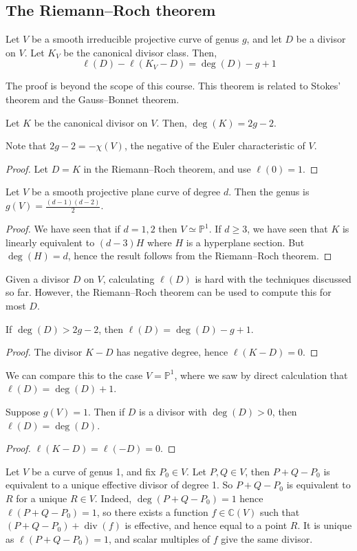 \subsection{The Riemann--Roch theorem}
\begin{theorem}
    Let \( V \) be a smooth irreducible projective curve of genus \( g \), and let \( D \) be a divisor on \( V \).
    Let \( K_V \) be the canonical divisor class.
    Then,
    \[ \ell(D) - \ell(K_V - D) = \deg(D) - g + 1 \]
\end{theorem}
The proof is beyond the scope of this course.
This theorem is related to Stokes' theorem and the Gauss--Bonnet theorem.
\begin{corollary}
    Let \( K \) be the canonical divisor on \( V \).
    Then, \( \deg(K) = 2g - 2 \).
\end{corollary}
Note that \( 2g - 2 = -\chi(V) \), the negative of the Euler characteristic of \( V \).
\begin{proof}
    Let \( D = K \) in the Riemann--Roch theorem, and use \( \ell(0) = 1 \).
\end{proof}
\begin{corollary}
    Let \( V \) be a smooth projective plane curve of degree \( d \).
    Then the genus is \( g(V) = \frac{(d-1)(d-2)}{2} \).
\end{corollary}
\begin{proof}
    We have seen that if \( d = 1, 2 \) then \( V \simeq \mathbb P^1 \).
    If \( d \geq 3 \), we have seen that \( K \) is linearly equivalent to \( (d-3)H \) where \( H \) is a hyperplane section.
    But \( \deg(H) = d \), hence the result follows from the Riemann--Roch theorem.
\end{proof}
Given a divisor \( D \) on \( V \), calculating \( \ell(D) \) is hard with the techniques discussed so far.
However, the Riemann--Roch theorem can be used to compute this for most \( D \).
\begin{corollary}
    If \( \deg(D) > 2g - 2 \), then \( \ell(D) = \deg(D) - g + 1 \).
\end{corollary}
\begin{proof}
    The divisor \( K - D \) has negative degree, hence \( \ell(K-D) = 0 \).
\end{proof}
We can compare this to the case \( V = \mathbb P^1 \), where we saw by direct calculation that \( \ell(D) = \deg(D) + 1 \).
\begin{corollary}
    Suppose \( g(V) = 1 \).
    Then if \( D \) is a divisor with \( \deg(D) > 0 \), then \( \ell(D) = \deg(D) \).
\end{corollary}
\begin{proof}
    \( \ell(K-D) = \ell(-D) = 0 \).
\end{proof}
Let \( V \) be a curve of genus 1, and fix \( P_0 \in V \).
Let \( P, Q \in V \), then \( P + Q - P_0 \) is equivalent to a unique effective divisor of degree 1.
So \( P + Q - P_0 \) is equivalent to \( R \) for a unique \( R \in V \).
Indeed, \( \deg(P+Q-P_0) = 1 \) hence \( \ell(P+Q-P_0) = 1 \), so there exists a function \( f \in \mathbb C(V) \) such that \( (P+Q-P_0) + \operatorname{div}(f) \) is effective, and hence equal to a point \( R \).
It is unique as \( \ell(P+Q-P_0) = 1 \), and scalar multiples of \( f \) give the same divisor.

